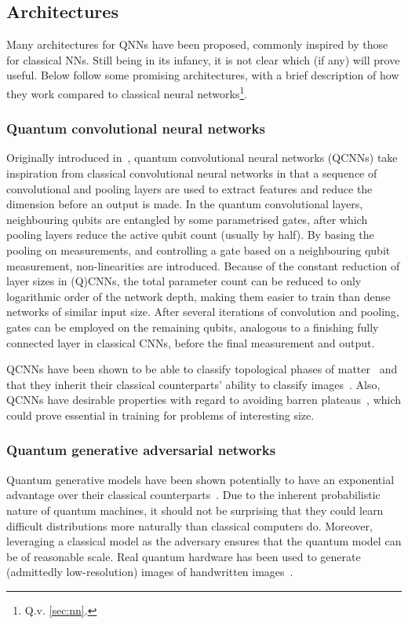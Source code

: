 \subsection{Architectures}
\label{sec:qnn_arch}
Many architectures for QNNs have been proposed, commonly inspired by those for classical NNs.
Still being in its infancy, it is not clear which (if any) will prove useful.
Below follow some promising architectures, with a brief description of how they work compared to classical neural networks\footnote{Q.v. \cref{sec:nn}.}.

\subsubsection{Quantum convolutional neural networks}
\label{sec:qcnn}
Originally introduced in~\autocite{cong2019}, quantum convolutional neural networks (QCNNs) take inspiration from classical convolutional neural networks in that a sequence of convolutional and pooling layers are used to extract features and reduce the dimension before an output is made.
In the quantum convolutional layers, neighbouring qubits are entangled by some parametrised gates, after which pooling layers reduce the active qubit count (usually by half).
By basing the pooling on measurements, and controlling a gate based on a neighbouring qubit measurement, non-linearities are introduced.
Because of the constant reduction of layer sizes in (Q)CNNs, the total parameter count can be reduced to only logarithmic order of the network depth, making them easier to train than dense networks of similar input size.
After several iterations of convolution and pooling, gates can be employed on the remaining qubits, analogous to a finishing fully connected layer in classical CNNs, before the final
measurement and output.

QCNNs have been shown to be able to classify topological phases of matter~\autocite{cong2019} and that they inherit their classical counterparts' ability to classify images~\autocite{oh2020}.
Also, QCNNs have desirable properties with regard to avoiding barren plateaus~\autocite{pesah2021}, which could prove essential in training for problems of interesting size.

\subsubsection{Quantum generative adversarial networks}
Quantum generative models have been shown potentially to have an exponential advantage over their classical counterparts~\autocite{gao2018}.
Due to the inherent probabilistic nature of quantum machines, it should not be surprising that they could learn difficult distributions more naturally than classical computers do.
Moreover, leveraging a classical model as the adversary ensures that the quantum model can be of reasonable scale.
Real quantum hardware has been used to generate (admittedly low-resolution) images of handwritten images~\autocite{huang2021}.

